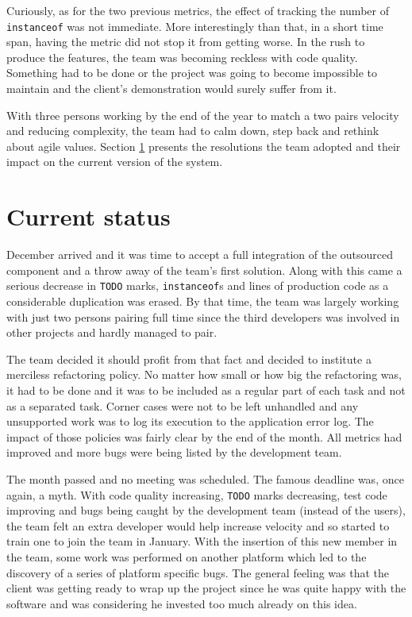 \documentclass[lnbip]{svmultln}
\begin{document}
Curiously, as for the two previous metrics, the effect of tracking the
number of \texttt{instanceof} was not immediate. More interestingly
than that, in a short time span, having the metric did not stop it
from getting worse. In the rush to produce the features, the team was
becoming reckless with code quality.  Something had to be done or the
project was going to become impossible to maintain and the client's
demonstration would surely suffer from it.

With three persons working by the end of the year to match a two pairs
velocity and reducing complexity, the team had to calm down, step back
and rethink about agile values. Section \ref{sec:nowadays} presents
the resolutions the team adopted and their impact on the current
version of the system.

\section{Current status}
\label{sec:nowadays}

December arrived and it was time to accept a full integration of the
outsourced component and a throw away of the team's first
solution. Along with this came a serious decrease in \texttt{TODO}
marks, \texttt{instanceof}s and lines of production code as a
considerable duplication was erased. By that time, the team was
largely working with just two persons pairing full time since the third
developers was involved in other projects and hardly managed to pair.

The team decided it should profit from that fact and decided to
institute a merciless refactoring policy. No matter how small or how
big the refactoring was, it had to be done and it was to be included
as a regular part of each task and not as a separated task. Corner
cases were not to be left unhandled and any unsupported work was to log
its execution to the application error log. The impact of those
policies was fairly clear by the end of the month. All metrics had
improved and more bugs were being listed by the development team.

The month passed and no meeting was scheduled. The famous deadline
was, once again, a myth. With code quality increasing, \texttt{TODO}
marks decreasing, test code improving and bugs being caught by the
development team (instead of the users), the team felt an extra
developer would help increase velocity and so started to train one to
join the team in January. With the insertion of this new member in the
team, some work was performed on another platform which led to the
discovery of a series of platform specific bugs. The general feeling
was that the client was getting ready to wrap up the project since he
was quite happy with the software and was considering he invested too
much already on this idea.
\end{document}
